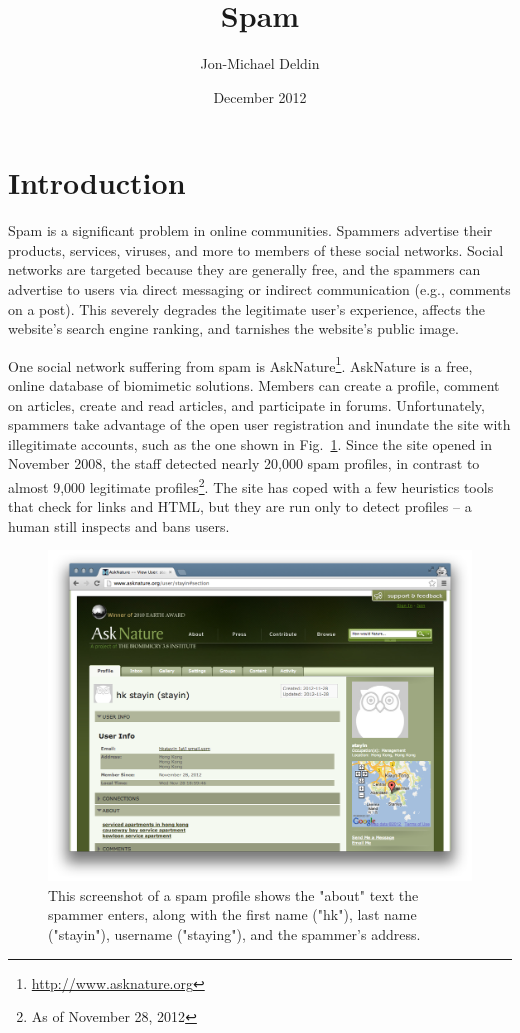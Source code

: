 \documentclass[10pt]{article}
\title{Spam}
\author{Jon-Michael Deldin}
\date{December 2012}
\begin{document}
\doublespace
\section{Introduction}
Spam is a significant problem in online communities. Spammers advertise their
products, services, viruses, and more to members of these social networks.
Social networks are targeted because they are generally free, and the spammers
can advertise to users via direct messaging or indirect communication (e.g.,
comments on a post). This severely degrades the legitimate user's experience,
affects the website's search engine ranking, and tarnishes the website's
public image.

One social network suffering from spam is
AskNature\footnote{\url{http://www.asknature.org} }. AskNature is a free,
online database of biomimetic\cite{benyus} solutions. Members can create a
profile, comment on articles, create and read articles, and participate in
forums. Unfortunately, spammers take advantage of the open user registration
and inundate the site with illegitimate accounts, such as the one shown in
Fig.~\ref{fig:spam-profile}. Since the site opened in November 2008, the staff
detected nearly 20,000 spam profiles, in contrast to almost 9,000 legitimate
profiles\footnote{As of November 28, 2012 }. The site has coped with a few
heuristics tools that check for links and HTML, but they are run only to
detect profiles -- a human still inspects and bans users.

\begin{figure}[b]
\centering
\includegraphics[width=\textwidth]{fig/spam-profile.png}
\caption{This screenshot of a spam profile shows the "about" text the spammer
enters, along with the first name ("hk"), last name ("stayin"), username
("staying"), and the spammer's address.}
\label{fig:spam-profile}
\end{figure}
\end{document}
